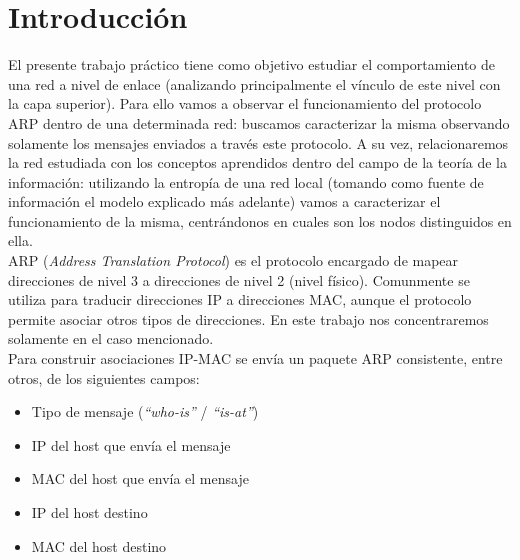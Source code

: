 \section{Introducci\'on}



El presente trabajo pr\'actico tiene como objetivo estudiar el comportamiento de una red a nivel de enlace (analizando principalmente el v\'inculo de este nivel con la capa superior). Para ello vamos a observar el funcionamiento del protocolo ARP dentro de una determinada red: buscamos caracterizar la misma observando solamente los mensajes enviados a trav\'es este protocolo. A su vez, relacionaremos la red estudiada con los conceptos aprendidos dentro del campo de la teor\'ia de la informaci\'on: utilizando la entrop\'ia de una red local (tomando como fuente de informaci\'on el modelo explicado m\'as adelante) vamos a caracterizar el funcionamiento de la misma, centr\'andonos en cuales son los nodos distinguidos en ella.\\

ARP (\emph{Address Translation Protocol}) es el protocolo encargado de mapear direcciones de nivel 3 a direcciones de nivel 2 (nivel f\'isico). Comunmente se utiliza para traducir direcciones IP a direcciones MAC, aunque el protocolo permite asociar otros tipos de direcciones. En este trabajo nos concentraremos solamente en el caso mencionado. \\


Para construir asociaciones IP-MAC se env\'ia un paquete ARP consistente, entre otros, de los siguientes campos:

\begin{itemize}
 \item Tipo de mensaje (\emph{``who-is''} / \emph{``is-at''})
 \item IP del host que env\'ia el mensaje
 \item MAC del host que env\'ia el mensaje
 \item IP del host destino
 \item MAC del host destino
\end{itemize}

